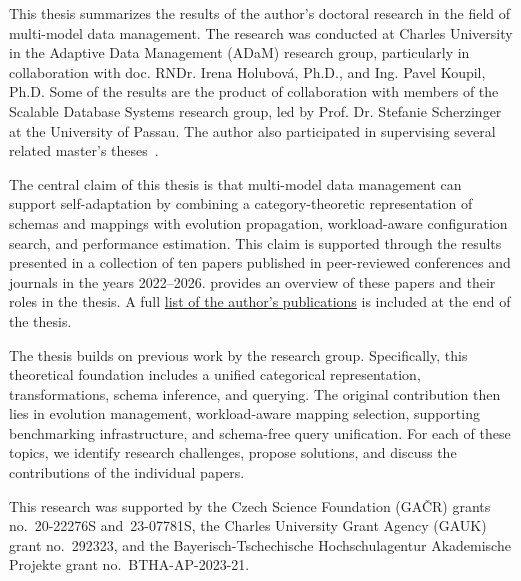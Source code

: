 
This thesis summarizes the results of the author's doctoral research in the field of multi-model data management. The research was conducted at Charles University in the Adaptive Data Management (ADaM) research group, particularly in collaboration with  doc. RNDr. Irena Holubová, Ph.D., and Ing. Pavel Koupil, Ph.D. Some of the results are the product of collaboration with members of the Scalable Database Systems research group, led by Prof. Dr. Stefanie Scherzinger at the University of Passau. The author also participated in supervising several related master's theses~\citep{srutkova-mastersthesis, strobl-mastersthesis, jezek-mastersthesis, mazourek-mastersthesis}.

The central claim of this thesis is that multi-model data management can support self-adaptation by combining a category-theoretic representation of schemas and mappings with evolution propagation, workload-aware configuration search, and performance estimation. This claim is supported through the results presented in a collection of ten papers published in peer-reviewed conferences and journals in the years 2022--2026.  provides an overview of these papers and their roles in the thesis. A full \hyperref[chap:publications]{list of the author's publications} is included at the end of the thesis.

The thesis builds on previous work by the research group. Specifically, this theoretical foundation includes a unified categorical representation, transformations, schema inference, and querying. The original contribution then lies in evolution management, workload-aware mapping selection, supporting benchmarking infrastructure, and schema-free query unification. For each of these topics, we identify research challenges, propose solutions, and discuss the contributions of the individual papers.

This research was supported by the Czech Science Foundation (GAČR) grants no.~20-22276S and~23-07781S, the Charles University Grant Agency (GAUK) grant no.~292323, and the Bayerisch-Tschechische Hochschulagentur Akademische Projekte grant no.~BTHA-AP-2023-21.

